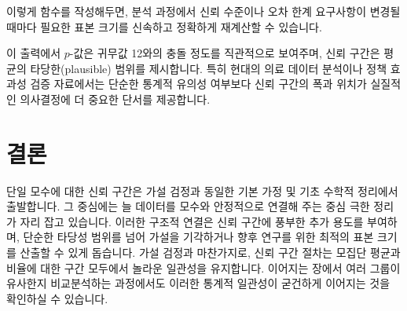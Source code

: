\documentclass[
]{scrbook}
\begin{document}
이렇게 함수를 작성해두면, 분석 과정에서 신뢰 수준이나 오차 한계
요구사항이 변경될 때마다 필요한 표본 크기를 신속하고 정확하게 재계산할
수 있습니다.

이 출력에서 \(p\)-값은 귀무값 12와의 충돌 정도를 직관적으로 보여주며,
신뢰 구간은 평균의 타당한(plausible) 범위를 제시합니다. 특히 현대의 의료
데이터 분석이나 정책 효과성 검증 자료에서는 단순한 통계적 유의성
여부보다 신뢰 구간의 폭과 위치가 실질적인 의사결정에 더 중요한 단서를
제공합니다.

\section{결론}\label{uxacb0uxb860}

단일 모수에 대한 신뢰 구간은 가설 검정과 동일한 기본 가정 및 기초 수학적
정리에서 출발합니다. 그 중심에는 늘 데이터를 모수와 안정적으로 연결해
주는 중심 극한 정리가 자리 잡고 있습니다. 이러한 구조적 연결은 신뢰
구간에 풍부한 추가 용도를 부여하며, 단순한 타당성 범위를 넘어 가설을
기각하거나 향후 연구를 위한 최적의 표본 크기를 산출할 수 있게 돕습니다.
가설 검정과 마찬가지로, 신뢰 구간 절차는 모집단 평균과 비율에 대한 구간
모두에서 놀라운 일관성을 유지합니다. 이어지는 장에서 여러 그룹이
유사한지 비교분석하는 과정에서도 이러한 통계적 일관성이 굳건하게
이어지는 것을 확인하실 수 있습니다.


\backmatter
\end{document}
